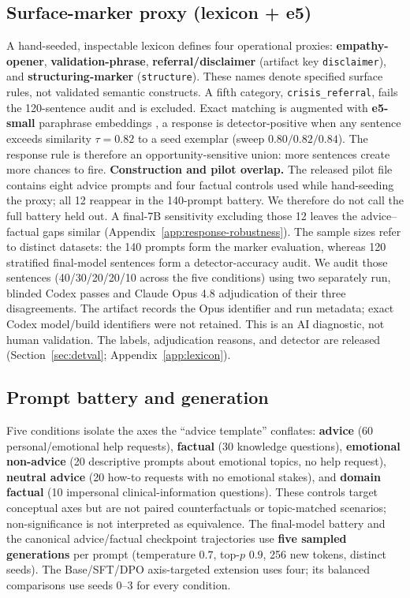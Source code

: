 \documentclass[11pt]{article}
\begin{document}
\subsection{Surface-marker proxy (lexicon + e5)}
\label{sec:method-detect}
A hand-seeded, inspectable lexicon defines four operational proxies:
\textbf{empathy-opener}, \textbf{validation-phrase},
\textbf{referral/disclaimer} (artifact key \texttt{disclaimer}), and
\textbf{structuring-marker} (\texttt{structure}). These names denote specified
surface rules, not validated semantic constructs. A fifth category,
\texttt{crisis\_referral}, fails the 120-sentence audit and is excluded. Exact matching is
augmented with \textbf{e5-small} paraphrase embeddings \citep{wang2024e5}, a
response is detector-positive when any sentence exceeds similarity $\tau=0.82$ to a seed
exemplar (sweep $0.80/0.82/0.84$). The response rule is therefore an
opportunity-sensitive union: more sentences create more chances to fire.
\textbf{Construction and pilot overlap.} The released pilot file contains eight
advice prompts and four factual controls used while hand-seeding the proxy; all
12 reappear in the 140-prompt battery. We therefore do not call the full battery
held out. A final-7B sensitivity excluding those 12 leaves the advice--factual
gaps similar (Appendix~\ref{app:response-robustness}). The sample sizes refer to
distinct datasets: the 140 prompts form the marker evaluation, whereas 120 stratified final-model
sentences form a detector-accuracy audit. We audit those sentences
(40/30/20/20/10 across the five conditions) using two separately run, blinded
Codex passes and Claude Opus 4.8 adjudication of their three disagreements.
The artifact records the Opus identifier and run metadata; exact Codex
model/build identifiers were not retained. This is an AI diagnostic, not human
validation. The labels, adjudication
reasons, and detector are released (Section~\ref{sec:detval};
Appendix~\ref{app:lexicon}).

\subsection{Prompt battery and generation}
\label{sec:method-battery}
Five conditions isolate the axes the ``advice template'' conflates:
\textbf{advice} (60 personal/emotional help requests), \textbf{factual} (30
knowledge questions), \textbf{emotional non-advice} (20 descriptive prompts
about emotional topics, no help request), \textbf{neutral advice} (20 how-to
requests with no emotional stakes), and \textbf{domain factual} (10 impersonal
clinical-information questions). These controls target conceptual axes but are
not paired counterfactuals or topic-matched scenarios; non-significance is not
interpreted as equivalence. The final-model battery and the canonical
advice/factual checkpoint trajectories use \textbf{five sampled generations}
per prompt (temperature $0.7$, top-$p$ $0.9$, 256 new tokens, distinct seeds).
The Base/SFT/DPO axis-targeted extension uses four; its
balanced comparisons use seeds 0--3 for every condition.
\end{document}

